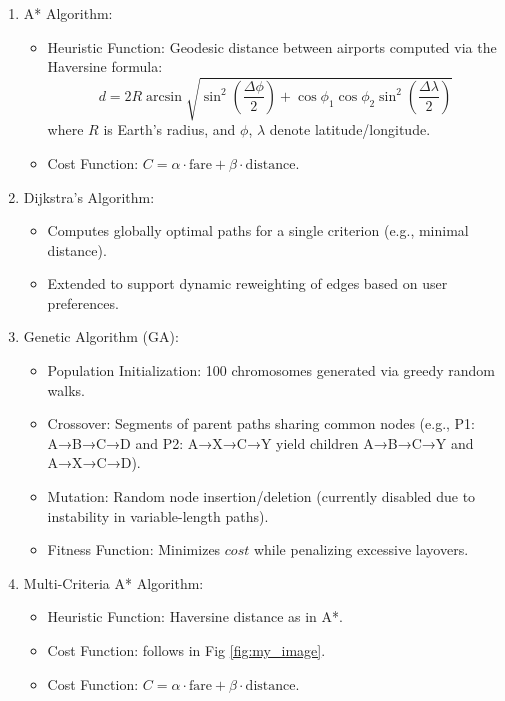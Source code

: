 \documentclass[conference]{IEEEtran}
\begin{document}
\begin{enumerate}
    \item A* Algorithm:  
        \begin{itemize}
            \item Heuristic Function: Geodesic distance between airports computed via the Haversine formula:  
              \[
              d = 2R \arcsin\sqrt{\sin^2\left(\frac{\Delta\phi}{2}\right) + \cos\phi_1 \cos\phi_2 \sin^2\left(\frac{\Delta\lambda}{2}\right)}
              \]  
              where \(R\) is Earth's radius, and \(\phi\), \(\lambda\) denote latitude/longitude.  
            \item Cost Function: \(C = \alpha \cdot \text{fare} + \beta \cdot \text{distance}\).  
        \end{itemize}
    
    \item Dijkstra's Algorithm:  
        \begin{itemize}
            \item Computes globally optimal paths for a single criterion (e.g., minimal distance).  
            \item Extended to support dynamic reweighting of edges based on user preferences.  
        \end{itemize}
    
    \item Genetic Algorithm (GA):  
        \begin{itemize}
            \item Population Initialization: 100 chromosomes generated via greedy random walks.  
            \item Crossover: Segments of parent paths sharing common nodes (e.g., P1: A→B→C→D and P2: A→X→C→Y yield children A→B→C→Y and A→X→C→D).  
            \item Mutation: Random node insertion/deletion (currently disabled due to instability in variable-length paths).  
            \item Fitness Function: Minimizes \(cost\) while penalizing excessive layovers.  
        \end{itemize}
    \item Multi-Criteria A* Algorithm:  
        \begin{itemize}
            \item Heuristic Function: Haversine distance as in A*.
            \item Cost Function: follows in Fig \ref{fig:my_image}.
            \item Cost Function: \(C = \alpha \cdot \text{fare} + \beta \cdot \text{distance}\). 
        \end{itemize}
\end{enumerate}
\end{document}
